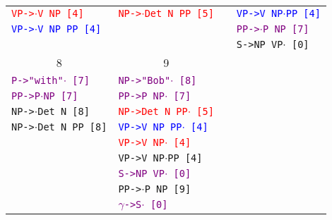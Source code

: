 \documentclass[a4paper]{article}
\begin{document}
\begin{enumerate}
\begin{table}[t]
\begin{tabular}{l|l|l|l}
\textcolor{red}{\texttt{VP->}$\cdot$\texttt{V NP [4]}} & \textcolor{red}{\texttt{NP->}$\cdot$\texttt{Det N PP [5]}} & & \textcolor{blue}{\texttt{VP->V NP}$\cdot$\texttt{PP [4]}} \\
\textcolor{blue}{\texttt{VP->}$\cdot$\texttt{V NP PP [4]}} & & & \textcolor{purple}{\texttt{PP->}$\cdot$\texttt{P NP [7]}} \\
 & & & \texttt{S->NP VP}$\cdot$\texttt{ [0]} \\
\hline
\multicolumn{1}{c}{8} & \multicolumn{1}{c}{9} & \multicolumn{1}{c}{} & \\
\hline
\textcolor{purple}{\texttt{P->"with"}$\cdot$\texttt{ [7]}} & \textcolor{purple}{\texttt{NP->"Bob"}$\cdot$\texttt{ [8]}} & & \\
\textcolor{purple}{\texttt{PP->P}$\cdot$\texttt{NP [7]}} & \textcolor{purple}{\texttt{PP->P NP}$\cdot$\texttt{ [7]}} & & \\
\texttt{NP->}$\cdot$\texttt{Det N [8]} & \textcolor{red}{\texttt{NP->Det N PP}$\cdot$\texttt{ [5]}} & & \\
\texttt{NP->}$\cdot$\texttt{Det N PP [8]} & \textcolor{blue}{\texttt{VP->V NP PP}$\cdot$\texttt{ [4]}} & & \\
 & \textcolor{red}{\texttt{VP->V NP}$\cdot$\texttt{ [4]}} & & \\
 & \texttt{VP->V NP}$\cdot$\texttt{PP [4]} & & \\
 & \textcolor{purple}{\texttt{S->NP VP}$\cdot$\texttt{ [0]}} & & \\
 & \texttt{PP->}$\cdot$\texttt{P NP [9]} & & \\
 & \textcolor{purple}{$\gamma$\texttt{->S}$\cdot$\texttt{ [0]}} & & \\
\hline
\end{tabular}
\end{table}


\end{enumerate}
\end{document}
